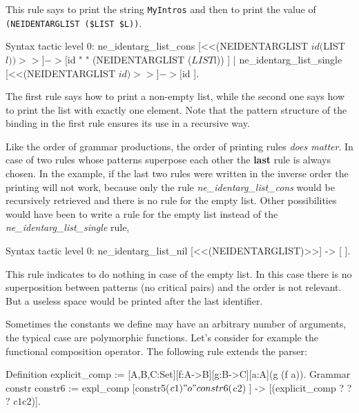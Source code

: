 {This rule says to print the string \verb+MyIntros+ and then to print
the value of \\
\verb+(NEIDENTARGLIST ($LIST $L))+.

\begin{coq_example}
Syntax tactic level 0:
  ne_identarg_list_cons [<<(NEIDENTARGLIST $id ($LIST $l))>>]
                            -> [ $id " " (NEIDENTARGLIST ($LIST $l)) ]
| ne_identarg_list_single [<<(NEIDENTARGLIST $id)>>] -> [ $id ].
\end{coq_example}


The first rule says how to print a non-empty list, while the second
one says how to print the list with exactly one element. Note that the
pattern structure of the binding in the first rule ensures its use in
a recursive way.

Like the order of grammar productions, the order of printing rules
\emph{does matter}. In case of two rules whose patterns superpose
each other the {\bf last} rule is always chosen.  In the example, if
the last two rules were written in the inverse order the printing will
not work, because only the rule {\sl ne\_identarg\_list\_cons} would
be recursively retrieved and there is no rule for the empty list.
Other possibilities would have been to write a rule for the empty list
instead of the {\sl ne\_identarg\_list\_single} rule,

\begin{coq_example}
Syntax tactic level 0:
  ne_identarg_list_nil [<<(NEIDENTARGLIST)>>] -> [ ].
\end{coq_example}

This rule indicates to do nothing in case of the empty list.  In this
case there is no superposition between patterns (no critical pairs)
and the order is not relevant. But a useless space would be printed
after the last identifier.


Sometimes the constants we define may have an arbitrary number of
arguments, the typical case are polymorphic functions. Let's consider
for example the functional composition operator. The following rule
extends the parser:

\begin{coq_example*}
Definition explicit_comp := [A,B,C:Set][f:A->B][g:B->C][a:A](g (f a)).
Grammar constr constr6 :=
  expl_comp [constr5($c1) "o" constr6($c2) ] ->
            [(explicit_comp ? ? ? $c1 $c2)].
\end{coq_example*}

}
